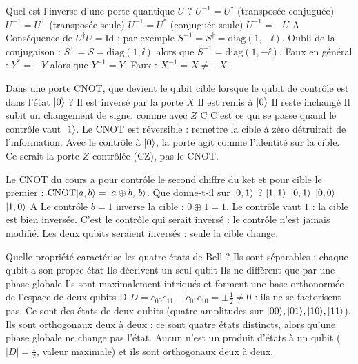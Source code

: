   {Quel est l'inverse d'une porte quantique $U$ ?}
  {$U^{-1}=U^\dagger$ (transposée conjuguée)}
  {$U^{-1}=U^{\mathsf T}$ (transposée seule)}
  {$U^{-1}=U^{*}$ (conjuguée seule)}
  {$U^{-1}=-U$}
  {A}
\qcmx
  {Conséquence de $U^\dagger U=\mathrm{Id}$ ; par exemple $S^{-1}=S^\dagger=\mathrm{diag}(1,-\ii)$.}
  {Oubli de la conjugaison : $S^{\mathsf T}=S=\mathrm{diag}(1,\ii)$ alors que $S^{-1}=\mathrm{diag}(1,-\ii)$.}
  {Faux en général : $Y^*=-Y$ alors que $Y^{-1}=Y$.}
  {Faux : $X^{-1}=X\neq-X$.}

  {Dans une porte CNOT, que devient le qubit cible lorsque le qubit de contrôle est dans l'état $|0\rangle$ ?}
  {Il est inversé par la porte $X$}
  {Il est remis à $|0\rangle$}
  {Il reste inchangé}
  {Il subit un changement de signe, comme avec $Z$}
  {C}
\qcmx
  {C'est ce qui se passe quand le contrôle vaut $|1\rangle$.}
  {Le CNOT est réversible : remettre la cible à zéro détruirait de l'information.}
  {Avec le contrôle à $|0\rangle$, la porte agit comme l'identité sur la cible.}
  {Ce serait la porte $Z$ contrôlée (CZ), pas le CNOT.}

  {Le CNOT du cours a pour contrôle le second chiffre du ket et pour cible le premier : $\mathrm{CNOT}|a,b\rangle=|a\oplus b,\,b\rangle$. Que donne-t-il sur $|0,1\rangle$ ?}
  {$|1,1\rangle$}
  {$|0,1\rangle$}
  {$|0,0\rangle$}
  {$|1,0\rangle$}
  {A}
\qcmx
  {Le contrôle $b=1$ inverse la cible : $0\oplus1=1$.}
  {Le contrôle vaut $1$ : la cible est bien inversée.}
  {C'est le contrôle qui serait inversé : le contrôle n'est jamais modifié.}
  {Les deux qubits seraient inversés : seule la cible change.}

  {Quelle propriété caractérise les quatre états de Bell ?}
  {Ils sont séparables : chaque qubit a son propre état}
  {Ils décrivent un seul qubit}
  {Ils ne diffèrent que par une phase globale}
  {Ils sont maximalement intriqués et forment une base orthonormée de l'espace de deux qubits}
  {D}
\qcmx
  {$D=c_{00}c_{11}-c_{01}c_{10}=\pm\frac12\neq0$ : ils ne se factorisent pas.}
  {Ce sont des états de deux qubits (quatre amplitudes sur $|00\rangle,|01\rangle,|10\rangle,|11\rangle$).}
  {Ils sont orthogonaux deux à deux : ce sont quatre états distincts, alors qu'une phase globale ne change pas l'état.}
  {Aucun n'est un produit d'états à un qubit ($|D|=\frac12$, valeur maximale) et ils sont orthogonaux deux à deux.}

